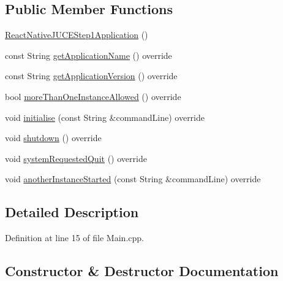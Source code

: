 \subsection*{Public Member Functions}
\begin{DoxyCompactItemize}
\item 
\mbox{\hyperlink{class_react_native_j_u_c_e_step1_application_a214f8a96e71f6611a185dcd70d0ad87a}{React\+Native\+J\+U\+C\+E\+Step1\+Application}} ()
\item 
const String \mbox{\hyperlink{class_react_native_j_u_c_e_step1_application_adcc1e5f857a72bed3783e31f465ff08c}{get\+Application\+Name}} () override
\item 
const String \mbox{\hyperlink{class_react_native_j_u_c_e_step1_application_a8c374c3a27af7aafab2cc6c294fea893}{get\+Application\+Version}} () override
\item 
bool \mbox{\hyperlink{class_react_native_j_u_c_e_step1_application_a51356d9330ab737202ee4a770d0724d2}{more\+Than\+One\+Instance\+Allowed}} () override
\item 
void \mbox{\hyperlink{class_react_native_j_u_c_e_step1_application_aab55019b53a2ce40f8245d0b18e6d4a5}{initialise}} (const String \&command\+Line) override
\item 
void \mbox{\hyperlink{class_react_native_j_u_c_e_step1_application_ab8d5118377fbb44016543b311e42b07c}{shutdown}} () override
\item 
void \mbox{\hyperlink{class_react_native_j_u_c_e_step1_application_a6e83d2c83b4d58b743f1f168622eb5a0}{system\+Requested\+Quit}} () override
\item 
void \mbox{\hyperlink{class_react_native_j_u_c_e_step1_application_a27d5dfd9ca82a8caafca191dbecdab22}{another\+Instance\+Started}} (const String \&command\+Line) override
\end{DoxyCompactItemize}


\subsection{Detailed Description}


Definition at line 15 of file Main.\+cpp.



\subsection{Constructor \& Destructor Documentation}
\mbox{\label{class_react_native_j_u_c_e_step1_application_a214f8a96e71f6611a185dcd70d0ad87a}} 
